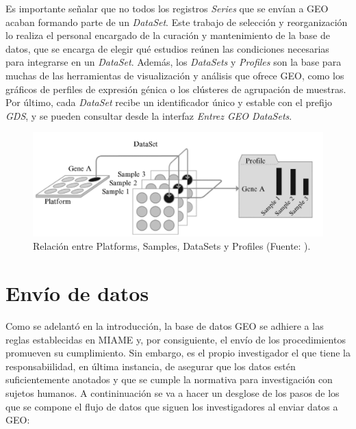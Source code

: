Es importante señalar que no todos los registros \textit{Series} que se envían a GEO acaban formando parte de un \textit{DataSet}. Este trabajo de selección y reorganización 
lo realiza el personal encargado de la curación y mantenimiento de la base de datos, que se encarga de elegir qué estudios reúnen las condiciones necesarias para integrarse 
en un \textit{DataSet}. Además, los \textit{DataSets} y \textit{Profiles} son la base para muchas de las herramientas de visualización y análisis que ofrece GEO, como los 
gráficos de perfiles de expresión génica o los clústeres de agrupación de muestras. Por último, cada \textit{DataSet} recibe un identificador único y estable con el prefijo 
\textit{GDS}, y se pueden consultar desde la interfaz \textit{Entrez GEO DataSets}.

\begin{figure}[h]
    \centering
    \includegraphics[width=1\textwidth]{../img/geo-datasets.png}
    \caption{Relación entre Platforms, Samples, DataSets y Profiles (Fuente: ).}  %
\end{figure}


\section{Envío de datos}


Como se adelantó en la introducción, la base de datos GEO se adhiere a las reglas establecidas en MIAME y, por consiguiente, el envío de los procedimientos promueven
su cumplimiento. Sin embargo, es el propio investigador el que tiene la responsabiilidad, en última instancia, de asegurar que los datos estén suficientemente anotados y
que se cumple la normativa para investigación con sujetos humanos. A contininuación se va a hacer un desglose de los pasos de los que se compone el flujo de datos que siguen 
los investigadores al enviar datos a GEO:

